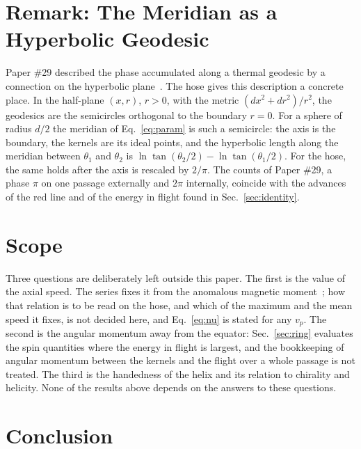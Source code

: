 \documentclass[%
 reprint, amsmath,amssymb, aps, prb, ]{revtex4-2}
\numberwithin{equation}{section}
\begin{document}
\section{Remark: The Meridian as a Hyperbolic Geodesic}
\label{sec:hyp}

Paper \#29 described the phase accumulated along a thermal geodesic by a connection on the hyperbolic plane~\cite{H29}. The hose gives this description a concrete place. In the half-plane $(x, r)$, $r > 0$, with the metric $(dx^2 + dr^2)/r^2$, the geodesics are the semicircles orthogonal to the boundary $r = 0$. For a sphere of radius $d/2$ the meridian of Eq.~\eqref{eq:param} is such a semicircle: the axis is the boundary, the kernels are its ideal points, and the hyperbolic length along the meridian between $\theta_1$ and $\theta_2$ is $\ln\tan(\theta_2/2) - \ln\tan(\theta_1/2)$. For the hose, the same holds after the axis is rescaled by $2/\pi$. The counts of Paper \#29, a phase $\pi$ on one passage externally and $2\pi$ internally, coincide with the advances of the red line and of the energy in flight found in Sec.~\ref{sec:identity}.

\section{Scope}
\label{sec:scope}

Three questions are deliberately left outside this paper. The first is the value of the axial speed. The series fixes it from the anomalous magnetic moment~\cite{H10,H66}; how that relation is to be read on the hose, and which of the maximum and the mean speed it fixes, is not decided here, and Eq.~\eqref{eq:nu} is stated for any $v_p$. The second is the angular momentum away from the equator: Sec.~\ref{sec:ring} evaluates the spin quantities where the energy in flight is largest, and the bookkeeping of angular momentum between the kernels and the flight over a whole passage is not treated. The third is the handedness of the helix and its relation to chirality and helicity. None of the results above depends on the answers to these questions.

\section{Conclusion}
\end{document}
